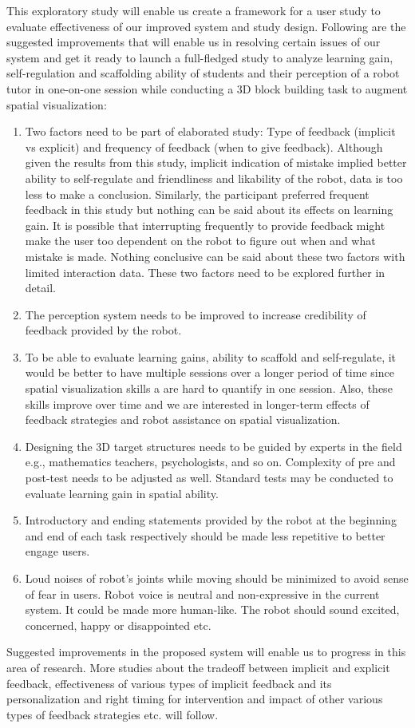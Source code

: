 This exploratory study will enable us create a framework for a user study to evaluate effectiveness of our improved system and study design. Following are the suggested improvements that will enable us in resolving certain issues of our system and get it ready to launch a full-fledged study to analyze learning gain, self-regulation and scaffolding ability of students and their perception of a robot tutor in one-on-one session while conducting a 3D block building task to augment spatial visualization:
\begin{enumerate}
    \item Two factors need to be part of elaborated study: Type of feedback (implicit vs explicit) and frequency of feedback (when to give feedback). Although given the results from this study, implicit indication of mistake implied better ability to self-regulate and friendliness and likability of the robot, data is too less to make a conclusion. Similarly, the participant preferred frequent feedback in this study but nothing can be said about its effects on learning gain. It is possible that interrupting frequently to provide feedback might make the user too dependent on the robot to figure out when and what mistake is made. Nothing conclusive can be said about these two factors with limited interaction data. These two factors need to be explored further in detail. 
    \item The perception system needs to be improved to increase credibility of feedback provided by the robot.
    \item To be able to evaluate learning gains, ability to scaffold and self-regulate, it would be better to have multiple sessions over a longer period of time since spatial visualization skills a are hard to quantify in one session. Also, these skills improve over time and we are interested in longer-term effects of feedback strategies and robot assistance on spatial visualization. 
    \item Designing the 3D target structures needs to be guided by experts in the field e.g., mathematics teachers, psychologists, and so on. Complexity of pre and post-test needs to be adjusted as well. Standard tests may be conducted to evaluate learning gain in spatial ability. 
    \item Introductory and ending statements provided by the robot at the beginning and end of each task respectively should be made less repetitive to better engage users.  
    \item Loud noises of robot's joints while moving should be minimized to avoid sense of fear in users. Robot voice is neutral and non-expressive in the current system. It could be made more human-like. The robot should sound excited, concerned, happy or disappointed etc. 
\end{enumerate}
Suggested improvements in the proposed system will enable us to progress in this area of research. More studies about the trade\-off between implicit and explicit feedback, effectiveness of various types of implicit feedback and its personalization and right timing for intervention and impact of other various types of feedback strategies etc. will follow.


